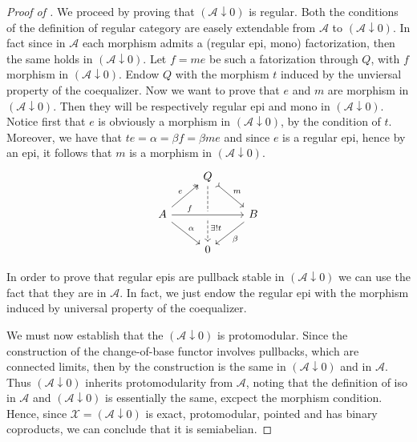 \begin{subbox}{}
\begin{proof}[\textit{Proof of }]
    We proceed by proving that $(\mathcal{A} \downarrow 0)$ is regular. Both the conditions of the definition of regular category are easely extendable from $\mathcal{A}$ to $(\mathcal{A} \downarrow 0)$. In fact since in $\mathcal{A}$ each morphism admits a (regular epi, mono) factorization, then the same holds in $(\mathcal{A} \downarrow 0)$. Let $f=me$ be such a fatorization through $Q$, with $f$ morphism in $(\mathcal{A} \downarrow 0)$. Endow $Q$ with the morphism $t$ induced by the unviersal property of the coequalizer. Now we want to prove that $e$ and $m$ are morphism in $(\mathcal{A} \downarrow 0)$. Then they will be respectively regular epi and mono in $(\mathcal{A} \downarrow 0)$. Notice first that $e$ is obviously a morphism in $(\mathcal{A} \downarrow 0)$, by the condition of $t$. Moreover, we have that $te=\alpha=\beta f= \beta me$ and since $e$ is a regular epi, hence by  an epi, it follows that $m$ is a morphism in $(\mathcal{A} \downarrow 0)$.
    \[
\begin{tikzcd}
    & Q \arrow[rd, "m", tail] \arrow[dd, "\exists ! t", pos=0.75, dashed] &                       \\
A \arrow[rr, "f", pos=0.25, crossing over] \arrow[ru, "e", two heads] \arrow[rd, "\alpha"] &                                                           & B \arrow[ld, "\beta"] \\
    & 0                                                         &                      
\end{tikzcd}
    \]

    In order to prove that regular epis are pullback stable in $(\mathcal{A} \downarrow 0)$ we can use the fact that they are in $\mathcal{A}$. In fact, we just endow the regular epi with the morphism induced by universal property of the coequalizer.

    We must now establish that the $(\mathcal{A} \downarrow 0)$ is protomodular. Since the construction of the change-of-base functor involves pullbacks, which are connected limits, then by  the construction is the same in $(\mathcal{A} \downarrow 0)$ and in $\mathcal{A}$. Thus $(\mathcal{A} \downarrow 0)$ inherits protomodularity from $\mathcal{A}$, noting that the definition of iso in $\mathcal{A}$ and $(\mathcal{A} \downarrow 0)$ is essentially the same, excpect the morphism condition. Hence, since $\mathcal{X} = (\mathcal{A} \downarrow 0)$ is exact, protomodular, pointed and has binary coproducts, we can conclude that it is semiabelian.


\end{proof}
\end{subbox}

